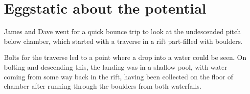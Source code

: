 \section{Eggstatic about the potential \protect{}}


James and Dave went for a quick bounce trip to look at the undescended
pitch below  chamber, which started with a traverse in a
rift part-filled with boulders.

Bolts for the traverse led to a point where a drop into a water could be
seen. On bolting and descending this, the landing was in a shallow pool,
with water coming from some way back in the rift, having been collected
on the floor of  chamber after running through the boulders
from both waterfalls.


